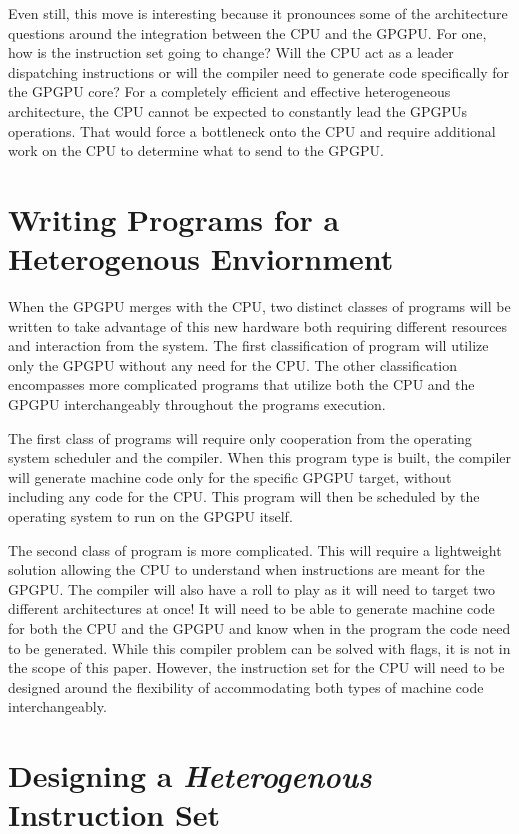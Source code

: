 Even still, this move is interesting because it pronounces some of the architecture questions around the integration between the CPU and the GPGPU. For one, how is the instruction set going to change? Will the CPU act as a leader dispatching instructions or will the compiler need to generate code specifically for the GPGPU core? For a completely efficient and effective heterogeneous architecture, the CPU cannot be expected to constantly lead the GPGPUs operations. That would force a bottleneck onto the CPU and require additional work on the CPU to determine what to send to the GPGPU. 


\section*{Writing Programs for a Heterogenous Enviornment}

When the GPGPU merges with the CPU, two distinct classes of programs will be written to take advantage of this new hardware both requiring different resources and interaction from the system. The first classification of program will utilize only the GPGPU without any need for the CPU. The other classification encompasses more complicated programs that utilize both the CPU and the GPGPU interchangeably throughout the programs execution. 

The first class of programs will require only cooperation from the operating system scheduler and the compiler. When this program type is built, the compiler will generate machine code only for the specific GPGPU target, without including any code for the CPU. This program will then be scheduled by the operating system to run on the GPGPU itself. 

The second class of program is more complicated. This will require a lightweight solution allowing the CPU to understand when instructions are meant for the GPGPU. The compiler will also have a roll to play as it will need to target two different architectures at once! It will need to be able to generate machine code for both the CPU and the GPGPU and know when in the program the code need to be generated. While this compiler problem can be solved with flags, it is not in the scope of this paper. However, the instruction set for the CPU will need to be designed around the flexibility of accommodating both types of machine code interchangeably. 


\section*{Designing a \textit{Heterogenous} Instruction Set}

